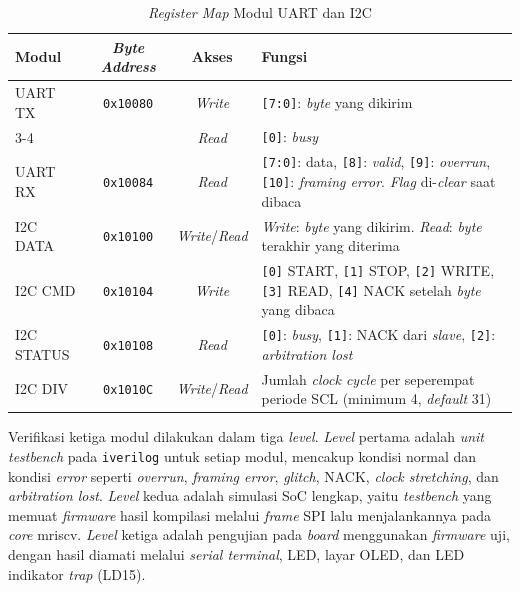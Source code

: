 \begin{table}[htbp]
	\centering
	\small
	\begin{tabular}{|l|c|c|p{7.2cm}|}
		\hline
		\textbf{Modul} & \textbf{\textit{Byte Address}} & \textbf{Akses} & \textbf{Fungsi} \\
		\hline
		UART TX & \texttt{0x10080} & \textit{Write} & \texttt{[7:0]}: \textit{byte} yang dikirim \\ \cline{3-4}
		 & & \textit{Read} & \texttt{[0]}: \textit{busy} \\ \hline
		UART RX & \texttt{0x10084} & \textit{Read} & \texttt{[7:0]}: data, \texttt{[8]}: \textit{valid}, \texttt{[9]}: \textit{overrun}, \texttt{[10]}: \textit{framing error}. \textit{Flag} di-\textit{clear} saat dibaca \\ \hline
		I2C DATA & \texttt{0x10100} & \textit{Write}/\textit{Read} & \textit{Write}: \textit{byte} yang dikirim. \textit{Read}: \textit{byte} terakhir yang diterima \\ \hline
		I2C CMD & \texttt{0x10104} & \textit{Write} & \texttt{[0]} START, \texttt{[1]} STOP, \texttt{[2]} WRITE, \texttt{[3]} READ, \texttt{[4]} NACK setelah \textit{byte} yang dibaca \\ \hline
		I2C STATUS & \texttt{0x10108} & \textit{Read} & \texttt{[0]}: \textit{busy}, \texttt{[1]}: NACK dari \textit{slave}, \texttt{[2]}: \textit{arbitration lost} \\ \hline
		I2C DIV & \texttt{0x1010C} & \textit{Write}/\textit{Read} & Jumlah \textit{clock cycle} per seperempat periode SCL (minimum 4, \textit{default} 31) \\ \hline
	\end{tabular}
	\normalsize
	\vspace{0.5em}
	\caption{\textit{Register Map} Modul UART dan I2C}
	\label{Tab: Register UART I2C}
\end{table}

Verifikasi ketiga modul dilakukan dalam tiga \textit{level}. \textit{Level} pertama adalah \textit{unit testbench} pada \texttt{iverilog} untuk setiap modul, mencakup kondisi normal dan kondisi \textit{error} seperti \textit{overrun}, \textit{framing error}, \textit{glitch}, NACK, \textit{clock stretching}, dan \textit{arbitration lost}. \textit{Level} kedua adalah simulasi SoC lengkap, yaitu \textit{testbench} yang memuat \textit{firmware} hasil kompilasi melalui \textit{frame} SPI lalu menjalankannya pada \textit{core} mriscv. \textit{Level} ketiga adalah pengujian pada \textit{board} menggunakan \textit{firmware} uji, dengan hasil diamati melalui \textit{serial terminal}, LED, layar OLED, dan LED indikator \textit{trap} (LD15).

